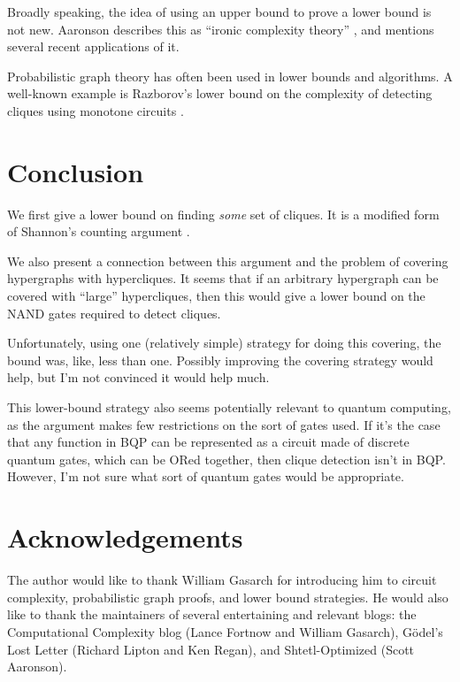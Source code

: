 \documentclass[12pt]{article}
\theoremstyle{definition}
\begin{document}
Broadly speaking, the idea of using an upper bound to prove a lower bound
is not new. Aaronson describes this as ``ironic complexity theory''
\cite{aaronson_pnp}, and mentions several recent applications of it.

Probabilistic graph theory has often been used in
lower bounds and algorithms. A well-known example is Razborov's lower
bound on the complexity of detecting cliques using monotone circuits
\cite{Razborov85lowerbounds}.

\section{Conclusion}

We first give a lower bound on finding {\em some} set of cliques.
It is a modified form of Shannon's counting argument
\cite{shannon_synthesis_1949}.

We also present a connection between this argument and the problem of covering
hypergraphs with hypercliques.
It seems that if an arbitrary hypergraph can be covered with 
``large'' hypercliques,
then this would give a lower bound on the NAND gates required to
detect cliques.

Unfortunately, using one (relatively simple) strategy for doing this covering,
the bound was, like, less than one. Possibly improving the covering
strategy would help, but I'm not convinced it would help much.

This lower-bound strategy also seems potentially
relevant to quantum computing,
as the argument makes few restrictions on the sort of gates used.
If it's the case that any function in BQP can be represented
as a circuit made of discrete quantum gates, which can be
ORed together, then clique detection isn't in BQP.
However, I'm not sure what sort of quantum gates would be
appropriate.

\section{Acknowledgements}

The author would like to thank William Gasarch for introducing him
to circuit complexity, probabilistic graph proofs, and lower bound strategies.
He would also like to thank the maintainers of
several entertaining and relevant blogs: the Computational Complexity blog
(Lance Fortnow and William Gasarch), 
G\"odel's Lost Letter (Richard Lipton and Ken Regan),
and Shtetl-Optimized (Scott Aaronson). 



\end{document}
